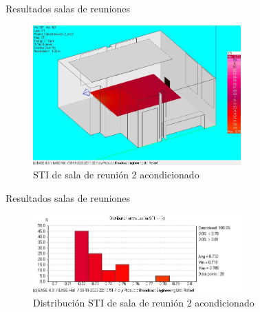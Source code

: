 \documentclass{sintefbeamer}
\begin{document}
\begin{frame}{Resultados salas de reuniones}
    \begin{figure}
        \centering
        \includegraphics[width=8cm]{images/STI acondicionado/STI_Reunion2_ConAcond.jpg}
        \caption{STI de sala de reunión 2 acondicionado}
        \label{fig:STI sala 2 acond}
    \end{figure}
\end{frame}

\begin{frame}{Resultados salas de reuniones}
    \begin{figure}
        \centering
        \includegraphics[width=8cm]{images/STI acondicionado/STIdist_Reunion2_ConAcond.jpg}
        \caption{Distribución STI de sala de reunión 2 acondicionado}
        \label{fig:dist STI sala 2 acond}
    \end{figure}
\end{frame}
\end{document}
